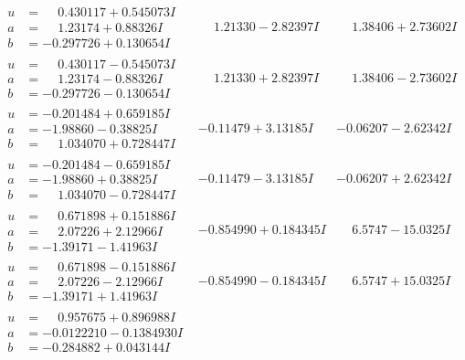 \documentclass[1p]{elsarticle_modified}
\theoremstyle{definition}
\begin{document}
$$\begin{array}{c|c|c}
\begin{aligned}
u &= \phantom{-}0.430117 + 0.545073 I \\
a &= \phantom{-}1.23174 + 0.88326 I \\
b &= -0.297726 + 0.130654 I\end{aligned}
 & \phantom{-}1.21330 - 2.82397 I & \phantom{-}1.38406 + 2.73602 I \\ \hline\begin{aligned}
u &= \phantom{-}0.430117 - 0.545073 I \\
a &= \phantom{-}1.23174 - 0.88326 I \\
b &= -0.297726 - 0.130654 I\end{aligned}
 & \phantom{-}1.21330 + 2.82397 I & \phantom{-}1.38406 - 2.73602 I \\ \hline\begin{aligned}
u &= -0.201484 + 0.659185 I \\
a &= -1.98860 - 0.38825 I \\
b &= \phantom{-}1.034070 + 0.728447 I\end{aligned}
 & -0.11479 + 3.13185 I & -0.06207 - 2.62342 I \\ \hline\begin{aligned}
u &= -0.201484 - 0.659185 I \\
a &= -1.98860 + 0.38825 I \\
b &= \phantom{-}1.034070 - 0.728447 I\end{aligned}
 & -0.11479 - 3.13185 I & -0.06207 + 2.62342 I \\ \hline\begin{aligned}
u &= \phantom{-}0.671898 + 0.151886 I \\
a &= \phantom{-}2.07226 + 2.12966 I \\
b &= -1.39171 - 1.41963 I\end{aligned}
 & -0.854990 + 0.184345 I & \phantom{-}6.5747 - 15.0325 I \\ \hline\begin{aligned}
u &= \phantom{-}0.671898 - 0.151886 I \\
a &= \phantom{-}2.07226 - 2.12966 I \\
b &= -1.39171 + 1.41963 I\end{aligned}
 & -0.854990 - 0.184345 I & \phantom{-}6.5747 + 15.0325 I \\ \hline\begin{aligned}
u &= \phantom{-}0.957675 + 0.896988 I \\
a &= -0.0122210 - 0.1384930 I \\
b &= -0.284882 + 0.043144 I\end{aligned}

\end{array}$$
\end{document}
